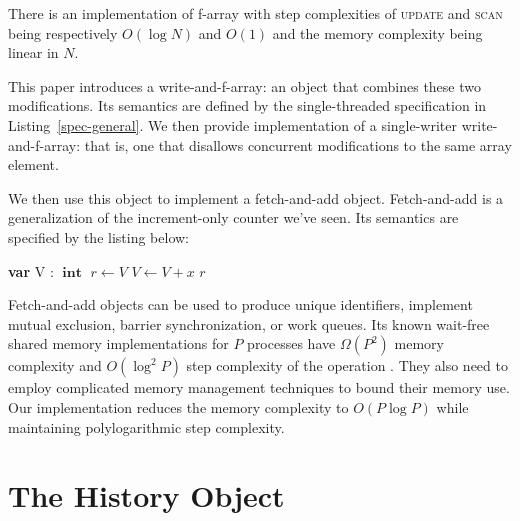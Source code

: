\documentclass[a4paper,11pt]{article}
\def\int{\ensuremath{\operatorname{\textbf{int}}}}
\newcommand{\fn}[1]{\textsc{#1}}
\newcommand{\var}[2]{\textbf{var }#1 : #2}
\begin{document}
There is an implementation of f-array with step complexities of \fn{update} and \fn{scan} being respectively $O(\log N)$ and $O(1)$ and the memory complexity
being linear in $N$.

This paper introduces a write-and-f-array: an object that combines these two modifications. Its semantics are defined by the single-threaded specification in Listing~\ref{spec-general}. We then provide implementation of a single-writer
write-and-f-array: that is, one that disallows concurrent modifications to the same array element.

We then use this object to implement a fetch-and-add object. Fetch-and-add is a generalization of the increment-only counter we've seen. Its semantics are specified by the listing below:

\begin{algorithmic}[1]
\State\var{V}{\int}
	\State $r \gets V$
	\State $V \gets V + x$
	\State\Return $r$
\EndFunction
\end{algorithmic}


Fetch-and-add objects can be used to produce unique identifiers, implement
mutual exclusion, barrier synchronization\cite{faa-sync}, or work queues\cite{faa-queue}. Its known wait-free shared memory implementations for $P$ processes have $\Omega(P^2)$ memory complexity and $O(\log^2 P)$ step complexity
of the operation \cite{ellen-fai}\cite{closed-object}. They also need to employ complicated memory management techniques to bound their memory use. Our implementation reduces the memory complexity to $O(P\log P)$ while maintaining polylogarithmic step complexity.




\section{The History Object}
\end{document}
